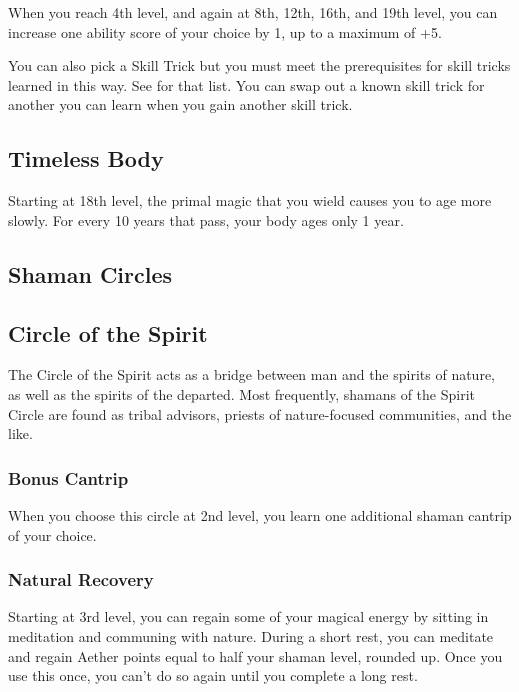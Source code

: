 When you reach 4th level, and again at 8th, 12th, 16th, and 19th level, you can increase one ability score of your choice by 1, up to a maximum of +5.

You can also pick a Skill Trick but you must meet the prerequisites for skill tricks learned in this way. See  for that list. You can swap out a known skill trick for another you can learn when you gain another skill trick.

\subsection{Timeless Body}

Starting at 18th level, the primal magic that you wield causes you to age more slowly. For every 10 years that pass, your body ages only 1 year.

\subsection{Shaman Circles}

\subsection{Circle of the Spirit}

The Circle of the Spirit acts as a bridge between man and the spirits of nature, as well as the spirits of the departed. Most frequently, shamans of the Spirit Circle are found as tribal advisors, priests of nature-focused communities, and the like.

\subsubsection{Bonus Cantrip}

When you choose this circle at 2nd level, you learn one additional shaman cantrip of your choice.

\subsubsection{Natural Recovery}

Starting at 3rd level, you can regain some of your magical energy by sitting in meditation and communing with nature. During a short rest, you can meditate and regain Aether points equal to half your shaman level, rounded up. Once you use this once, you can't do so again until you complete a long rest.


